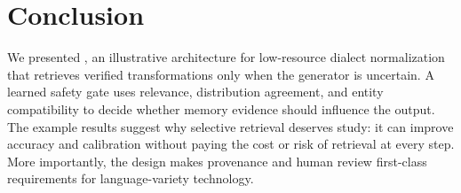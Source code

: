 \section{Conclusion}
\label{sec:conclusion}

We presented \method, an illustrative architecture for low-resource dialect
normalization that retrieves verified transformations only when the generator
is uncertain. A learned safety gate uses relevance, distribution agreement,
and entity compatibility to decide whether memory evidence should influence
the output. The example results suggest why selective retrieval deserves study:
it can improve accuracy and calibration without paying the cost or risk of
retrieval at every step. More importantly, the design makes provenance and
human review first-class requirements for language-variety technology.

